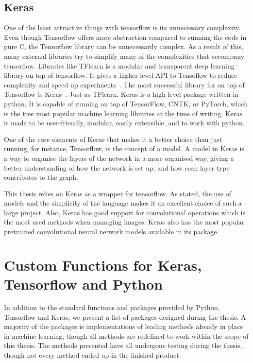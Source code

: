 \subsection{Keras}
One of the least attractive things with tensorflow is its unnecessary complexity.  Even though Tensorflow offers more abstraction compared to running the code in pure C, the Tensorflow library can be unnecessarily complex. As a result of this, many external libraries try to simplify many of the complexities that accompany tensorflow. 
Libraries like TFlearn is a modular and transparent deep learning library on top of tensorflow. It gives a higher-level API to Tensoflow to reduce complexity and speed up experiments~\cite{tflearn2016}.
The most successful library for on top of Tensorflow is Keras~\cite{Keras.io}. 
Just as TFlearn, Keras is a high-level package written in python. It is capable of running on top of TensorFlow, CNTK, or PyTorch, which is the tree most popular machine learning libraries at the time of writing.  Keras is made to be user-friendly, modular, easily extensible, and to work with python.

One of the core elements of Keras that makes it a better choice than just running, for instance, Tensorflow, is the concept of a model. A model in Keras is a way to organise the layers of the network in a more organised way, giving a better understanding of how the network is set up, and how each layer type contributes to the graph. 

This thesis relies on Keras as a wrapper for tensorflow. As stated, the use of models and the simplicity of the language makes it an excellent choice of such a large project. Also, Keras has good support for convolutional operations which is the most used methods when managing images. Keras also has the most popular pretrained convolutional neural network models available in its package.





    
\section{Custom Functions for Keras, Tensorflow and Python}
In addition to the standard functions and packages provided by Python, Tensorflow and Keras, we present a list of packages designed during the thesis. A majority of the packages is implementations of leading methods already in place in machine learning, though all methods are redefined to work within the scope of this thesis.
The methods presented have all undergone testing during the thesis, though not every method ended up in the finished product.


